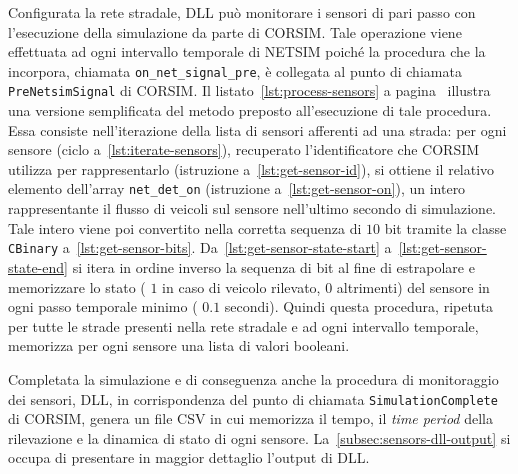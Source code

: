 Configurata la rete stradale,  \acs{DLL} può monitorare i sensori di pari passo con l'esecuzione della simulazione da parte di \acs{CORSIM}. Tale operazione viene effettuata ad ogni intervallo temporale di \acs{NETSIM} poiché la procedura che la incorpora, chiamata \lstinline[]|on_net_signal_pre|, è collegata al punto di chiamata \lstinline[]|PreNetsimSignal| di \acs{CORSIM}. Il listato~\ref{lst:process-sensors} a pagina~\pageref{lst:process-sensors} illustra una versione semplificata del metodo \CC{} preposto all'esecuzione di tale procedura. Essa consiste nell'iterazione della lista di sensori afferenti ad una strada: per ogni sensore (ciclo a~\autoref{lst:iterate-sensors}), recuperato l'identificatore che \acs{CORSIM} utilizza per rappresentarlo (istruzione a~\autoref{lst:get-sensor-id}), si ottiene il relativo elemento dell'array \lstinline[]|net_det_on| (istruzione a~\autoref{lst:get-sensor-on}), un intero rappresentante il flusso di veicoli sul sensore nell'ultimo secondo di simulazione. Tale intero viene poi convertito nella corretta sequenza di $10$ bit tramite la classe \lstinline[]|CBinary| a~\autoref{lst:get-sensor-bits}. Da~\autoref{lst:get-sensor-state-start} a~\autoref{lst:get-sensor-state-end} si itera in ordine inverso la sequenza di bit al fine di estrapolare e memorizzare lo stato (\ie{} $1$ in caso di veicolo rilevato, $0$ altrimenti) del sensore in ogni passo temporale minimo (\ie{} $0.1$ secondi). Quindi questa procedura, ripetuta per tutte le strade presenti nella rete stradale e ad ogni intervallo temporale, memorizza per ogni sensore una lista di valori booleani.

Completata la simulazione e di conseguenza anche la procedura di monitoraggio dei sensori,  \acs{DLL}, in corrispondenza del punto di chiamata \lstinline[]|SimulationComplete| di \acs{CORSIM}, genera un file \acs{CSV} in cui memorizza il tempo, il \emph{time period} della rilevazione e la dinamica di stato di ogni sensore. La~\autoref{subsec:sensors-dll-output}  si occupa di presentare in maggior dettaglio l'output di  \acs{DLL}.

